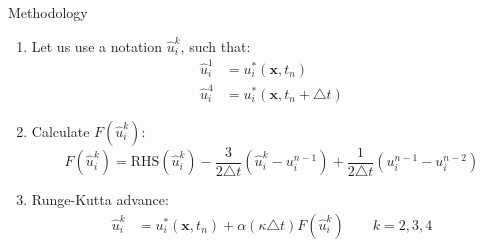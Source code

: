 \documentclass{beamer}
\newcommand{\timestep}{ \triangle t }
\begin{document}
\begin{frame}{Methodology}
\begin{enumerate}
			\begin{enumerate}
				\item Let us use a notation $\hat{u}_i^k$, such that:
					\begin{align}
						\hat{u}_i^1 &= u_i^*(\mathbf{x}, t_n) \\
						\hat{u}_i^4 &= u_i^*(\mathbf{x}, t_n + \timestep)
					\end{align}
				\item Calculate $F(\hat{u}_i^k)$:
					\begin{equation}
						F(\hat{u}_i^k) = \text{RHS}(\hat{u}_i^k) - \frac{3}{2 \timestep} \left( \hat{u}_i^k - u_i^{n-1} \right) + \frac{1}{2 \timestep} \left( u_i^{n-1} - u_i^{n-2} \right)
					\end{equation}
				\item Runge-Kutta advance:
					\begin{align}
						\hat{u}_i^k &= u_i^*(\mathbf{x}, t_n) + \alpha \left( \kappa \timestep \right) F(\hat{u}_i^k) \qquad k = 2,3,4 \\
					\end{align}
			\end{enumerate}
	\end{enumerate}
	
\end{frame}
\end{document}

